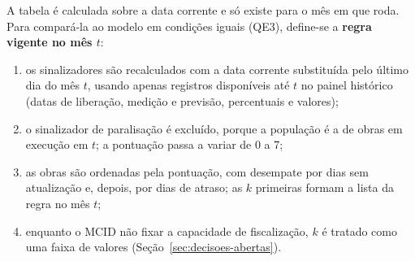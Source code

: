 A tabela é calculada sobre a data corrente e só existe para o mês em que roda. Para compará-la ao modelo em condições iguais (QE3), define-se a \textbf{regra vigente no mês $t$}:

\begin{enumerate}
	\item os sinalizadores são recalculados com a data corrente substituída pelo último dia do mês $t$, usando apenas registros disponíveis até $t$ no painel histórico (datas de liberação, medição e previsão, percentuais e valores);
	\item o sinalizador de paralisação é excluído, porque a população é a de obras em execução em $t$; a pontuação passa a variar de 0 a 7;
	\item as obras são ordenadas pela pontuação, com desempate por dias sem atualização e, depois, por dias de atraso; as $k$ primeiras formam a lista da regra no mês $t$;
	\item enquanto o MCID não fixar a capacidade de fiscalização, $k$ é tratado como uma faixa de valores (Seção~\ref{sec:decisoes-abertas}).
\end{enumerate}

